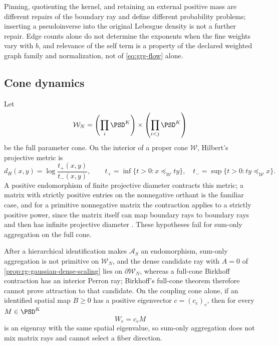 Pinning, quotienting the kernel, and retaining an external positive mass are
different repairs of the boundary ray and define different probability
problems; inserting a pseudoinverse into the original Lebesgue density is not
a further repair. Edge counts alone do not determine the exponents when the
fine weights vary with \(b\), and relevance of the self term is a property of
the declared weighted graph family and normalization, not of
\eqref{eq:grg-flow} alone.

\subsection{Cone dynamics}
\label{sec:grg-cones}

Let
\begin{equation}
\mathcal W_N
=\left(\prod_i\PSD^K\right)\times\left(\prod_{i<j}\PSD^K\right)
\label{eq:grg-full-cone}
\end{equation}
be the full parameter cone. On the interior of a proper cone \(\mathcal W\),
Hilbert's projective metric is
\begin{equation}
d_H(x,y)=\log\frac{t_+(x,y)}{t_-(x,y)},
\qquad
t_+=\inf\{t>0:x\preceq_{\mathcal W}ty\},
\quad
t_-=\sup\{t>0:ty\preceq_{\mathcal W}x\}.
\label{eq:grg-hilbert}
\end{equation}
A positive endomorphism of finite projective diameter contracts this metric; a
matrix with strictly positive entries on the nonnegative orthant is the
familiar case, and for a primitive nonnegative matrix the contraction applies
to a strictly positive power, since the matrix itself can map boundary rays to
boundary rays and then has infinite projective diameter
\citep{Birkhoff1957,nussbaum1988hilbert}. These hypotheses fail for sum-only
aggregation on the full cone.

After a hierarchical identification makes \(\mathcal A_S\) an endomorphism,
sum-only aggregation is not primitive on \(\mathcal W_N\), and the dense
candidate ray with \(A=0\) of \cref{prop:rg-gaussian-dense-scaling} lies on
\(\partial\mathcal W_N\), whereas a full-cone Birkhoff contraction has an
interior Perron ray; Birkhoff's full-cone theorem therefore cannot prove
attraction to that candidate. On the coupling cone alone, if an identified
spatial map \(B\geq0\) has a positive eigenvector \(c=(c_e)_e\), then for every
\(M\in\PSD^K\)
\begin{equation}
W_e=c_eM
\label{eq:grg-inert-fiber}
\end{equation}
is an eigenray with the same spatial eigenvalue, so sum-only aggregation does
not mix matrix rays and cannot select a fiber direction. 

